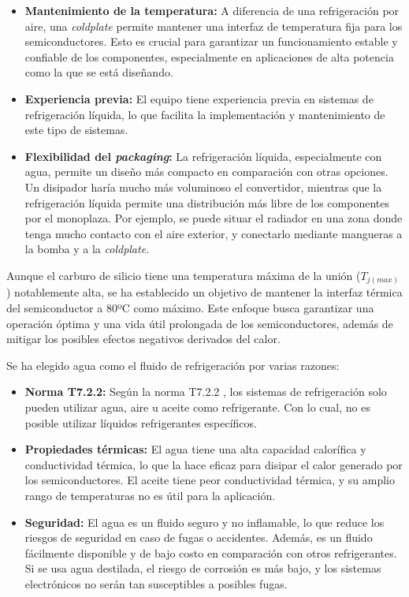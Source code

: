 \begin{itemize}
	\item \textbf{Mantenimiento de la temperatura:} A diferencia de una refrigeración por aire, una \textit{coldplate} permite mantener una interfaz de temperatura fija para los semiconductores. Esto es crucial para garantizar un funcionamiento estable y confiable de los componentes, especialmente en aplicaciones de alta potencia como la que se está diseñando.
	
	\item \textbf{Experiencia previa:} El equipo tiene experiencia previa en sistemas de refrigeración líquida, lo que facilita la implementación y mantenimiento de este tipo de sistemas.
	
	\item \textbf{Flexibilidad del \textit{packaging}:} La refrigeración líquida, especialmente con agua, permite un diseño más compacto en comparación con otras opciones. Un disipador haría mucho más voluminoso el convertidor, mientras que la refrigeración líquida permite una distribución más libre de los componentes por el monoplaza. Por ejemplo, se puede situar el radiador en una zona donde tenga mucho contacto con el aire exterior, y conectarlo mediante mangueras a la bomba y a la \textit{coldplate}.
	
	
\end{itemize}

Aunque el carburo de silicio tiene una temperatura máxima de la unión (\(T_{j(max)}\)) notablemente alta, se ha establecido un objetivo de mantener la interfaz térmica del semiconductor a 80ºC como máximo. Este enfoque busca garantizar una operación óptima y una vida útil prolongada de los semiconductores, además de mitigar los posibles efectos negativos derivados del calor.

Se ha elegido agua como el fluido de refrigeración por varias razones:

\begin{itemize}
	\item \textbf{Norma T7.2.2:} Según la norma T7.2.2 \cite{FSG}, los sistemas de refrigeración solo pueden utilizar agua, aire u aceite como refrigerante. Con lo cual, no es posible utilizar líquidos refrigerantes específicos.
	
	\item \textbf{Propiedades térmicas:} El agua tiene una alta capacidad calorífica y conductividad térmica, lo que la hace eficaz para disipar el calor generado por los semiconductores. El aceite tiene peor conductividad térmica, y su amplio rango de temperaturas no es útil para la aplicación.
	
	\item \textbf{Seguridad:} El agua es un fluido seguro y no inflamable, lo que reduce los riesgos de seguridad en caso de fugas o accidentes. Además, es un fluido fácilmente disponible y de bajo costo en comparación con otros refrigerantes. Si se usa agua destilada, el riesgo de corrosión es más bajo, y los sistemas electrónicos no serán tan susceptibles a posibles fugas.
	
\end{itemize}

